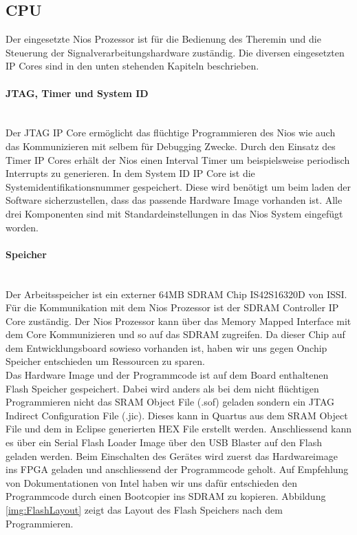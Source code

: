 \subsection{CPU}\label{subsec:CPU}
Der eingesetzte Nios Prozessor ist für die Bedienung des Theremin und die Steuerung der Signalverarbeitungshardware zuständig. Die diversen eingesetzten IP Cores sind in den unten stehenden Kapiteln beschrieben.

\paragraph{JTAG, Timer und System ID}\mbox{}\\
Der JTAG IP Core ermöglicht das flüchtige Programmieren des Nios wie auch das Kommunizieren mit selbem für Debugging Zwecke. 
Durch den Einsatz des Timer IP Cores erhält der Nios einen Interval Timer um beispielsweise periodisch Interrupts zu generieren. 
In dem System ID IP Core ist die Systemidentifikationsnummer gespeichert. Diese wird benötigt um beim laden der Software sicherzustellen, dass das passende Hardware Image vorhanden ist.
Alle drei Komponenten sind mit Standardeinstellungen in das Nios System eingefügt worden.

\paragraph{Speicher}\mbox{}\\

Der Arbeitsspeicher ist ein externer 64MB SDRAM Chip IS42S16320D von ISSI. Für die Kommunikation mit dem Nios Prozessor ist der SDRAM Controller IP Core zuständig. Der Nios Prozessor kann über das Memory Mapped Interface mit dem Core Kommunizieren und so auf das SDRAM zugreifen. Da dieser Chip auf dem Entwicklungsboard sowieso vorhanden ist, haben wir uns gegen Onchip Speicher entschieden um Ressourcen zu sparen.\\

Das Hardware Image und der Programmcode ist auf dem Board enthaltenen Flash Speicher gespeichert. Dabei wird anders als bei dem nicht flüchtigen Programmieren nicht das SRAM Object File (.sof) geladen sondern ein JTAG Indirect Configuration File (.jic). Dieses kann in Quartus aus dem SRAM Object File und dem in Eclipse generierten HEX File erstellt werden. Anschliessend kann es über ein Serial Flash Loader Image über den USB Blaster auf den Flash geladen werden. Beim Einschalten des Gerätes wird zuerst das Hardwareimage ins FPGA geladen und anschliessend der Programmcode geholt. Auf Empfehlung von Dokumentationen von Intel haben wir uns dafür entschieden den Programmcode durch einen Bootcopier ins SDRAM zu kopieren. Abbildung \ref{img:FlashLayout} zeigt das Layout des Flash Speichers nach dem Programmieren. \cite{non_volatile}


